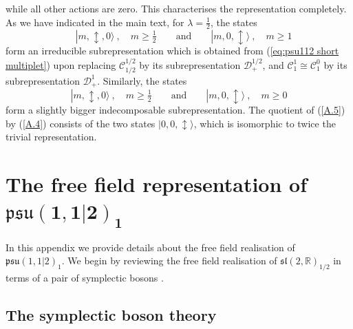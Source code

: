 \documentclass[12pt,a4paper]{article}
\newcommand{\be}{\begin{equation}}
\newcommand{\ee}{\end{equation}}
\newcommand{\ket}[1]{| #1\rangle}
\begin{document}
while all other actions are zero. This characterises the representation completely. As we have indicated in the main text, for $\lambda=\tfrac{1}{2}$, the states
\be\label{A.4}
\quad \ket{m,\updownarrow,0}\ , \quad m\ge \tfrac{1}{2}\qquad\text{and}\qquad \ket{m,0,\updownarrow}\ , \quad m \ge 1
\ee
form an irreducible subrepresentation which is obtained from (\ref{eq:psu112 short multiplet}) upon replacing 
$\mathscr{C}^{1/2}_{1/2}$ by its subrepresentation $\mathscr{D}^{1/2}_+$, and $\mathscr{C}^{1}_{1} \cong\mathscr{C}^{0}_{1}$ by its subrepresentation $\mathscr{D}^{1}_+$.
Similarly, the states 
\be\label{A.5}
\ket{m,\updownarrow,0}\ , \quad m\ge \tfrac{1}{2}\qquad\text{and}\qquad \ket{m,0,\updownarrow}\ , \quad m \ge 0
\ee
form a slightly bigger indecomposable subrepresentation. The quotient of (\ref{A.5}) by (\ref{A.4}) 
consists of the two states $\ket{0,0,\updownarrow}$, which is isomorphic to twice the trivial representation.

\section{The free field representation of $\boldsymbol{\mathfrak{psu}(1,1|2)_1}$} \label{app:free field representation}

In this appendix we provide details about the free field realisation of $\mathfrak{psu}(1,1|2)_1$. We begin by reviewing the free field realisation of $\mathfrak{sl}(2,\mathds{R})_{1/2}$ in terms of a pair of symplectic bosons  \cite{Lesage:2002ch, Ridout:2010jk}. 

\subsection{The symplectic boson theory} \label{subapp:symplectic boson}
\end{document}
